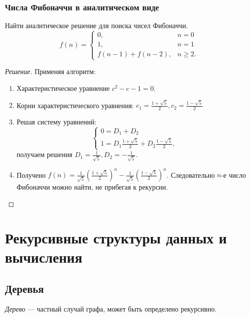 \begin{frame}[allowframebreaks]
    \frametitle{Числа Фибоначчи в аналитическом виде}

    \begin{example}
        Найти аналитическое решение для поиска чисел Фибоначчи.
        \[
            f(n)=
            \begin{cases}
                0,              &n=0\\
                1,              &n=1\\
                f(n-1)+f(n-2),  &n\geq 2.
            \end{cases}
        \]
    \end{example}
    \begin{proof}[Решение] 
        Применяя алгоритм:
        
        \begin{enumerate}
            \item Характеристическое уравнение $c^2-c-1=0$.
            \item Корни характеристического уравнения: $c_1=\frac{1+\sqrt{5}}{2},c_2=\frac{1-\sqrt{5}}{2}$
            \item Решая систему уравнений:
            \[
                \begin{cases}
                    0=D_1 + D_2\\
                    1=D_1\frac{1+\sqrt{5}}{2} + D_2\frac{1-\sqrt{5}}{2},
                \end{cases}
            \]
            получаем решения $D_1=\frac{1}{\sqrt{5}}, D_2=-\frac{1}{\sqrt{5}}$.
            \item Получено $f(n)=\frac{1}{\sqrt{5}}(\frac{1+\sqrt{5}}{2})^n-\frac{1}{\sqrt{5}}(\frac{1-\sqrt{5}}{2})^n$. Следовательно $n$-е число Фибоначчи можно найти, не прибегая к рекурсии.
        \end{enumerate}
    \end{proof}
\end{frame}


\section{Рекурсивные структуры данных и вычисления}


\subsection{Деревья}

\emph{Дерево} --- частный случай графа, может быть определено рекурсивно.

